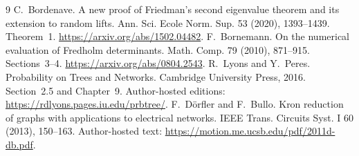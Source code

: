 \documentclass[11pt]{article}
\begin{document}
\begin{thebibliography}{9}
 C.~Bordenave. A new proof of Friedman's second
eigenvalue theorem and its extension to random lifts. Ann. Sci. Ecole
Norm. Sup. 53 (2020), 1393--1439. Theorem~1.
\url{https://arxiv.org/abs/1502.04482}.
 F.~Bornemann. On the numerical evaluation of Fredholm
determinants. Math. Comp. 79 (2010), 871--915. Sections~3--4.
\url{https://arxiv.org/abs/0804.2543}.
 R.~Lyons and Y.~Peres. Probability on Trees and
Networks. Cambridge University Press, 2016. Section~2.5 and Chapter~9.
Author-hosted editions: \url{https://rdlyons.pages.iu.edu/prbtree/}.
 F.~D\"orfler and F.~Bullo. Kron reduction of
graphs with applications to electrical networks. IEEE Trans. Circuits
Syst. I 60 (2013), 150--163. Author-hosted text:
\url{https://motion.me.ucsb.edu/pdf/2011d-db.pdf}.
\end{thebibliography}
\end{document}
